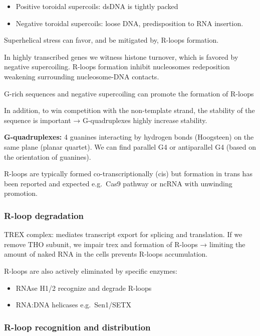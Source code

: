 \begin{itemize}
\tightlist
\item
  Positive toroidal supercoils: dsDNA is tightly packed
\item
  Negative toroidal supercoils: loose DNA, predisposition to RNA insertion.
\end{itemize}

Superhelical stress can favor, and be mitigated by, R-loops formation.

In highly transcribed genes we witness histone turnover, which is favored by negative supercoiling. R-loops formation inhibit nucleosomes redeposition weakening surrounding nucleosome-DNA contacts.

G-rich sequences and negative supercoiling can promote the formation of R-loops

In addition, to win competition with the non-template strand, the stability of the sequence is important → G-quadruplexes highly increase stability.

\textbf{G-quadruplexes:} 4 guanines interacting by hydrogen bonds (Hoogsteen) on the same plane (planar quartet). We can find parallel G4 or antiparallel G4 (based on the orientation of guanines).

R-loops are typically formed co-transcriptionally (cis) but formation in trans has been reported and expected e.g.~Cas9 pathway or ncRNA with unwinding promotion.

\hypertarget{r-loop-degradation}{%
\subsubsection{R-loop degradation}\label{r-loop-degradation}}

TREX complex: mediates transcript export for splicing and translation. If we remove THO subunit, we impair trex and formation of R-loops → limiting the amount of naked RNA in the cells prevents R-loops accumulation.

R-loops are also actively eliminated by specific enzymes:

\begin{itemize}
\tightlist
\item
  RNAse H1/2 recognize and degrade R-loops
\item
  RNA:DNA helicases e.g.~Sen1/SETX
\end{itemize}

\hypertarget{r-loop-recognition-and-distribution}{%
\subsubsection{R-loop recognition and distribution}\label{r-loop-recognition-and-distribution}}

